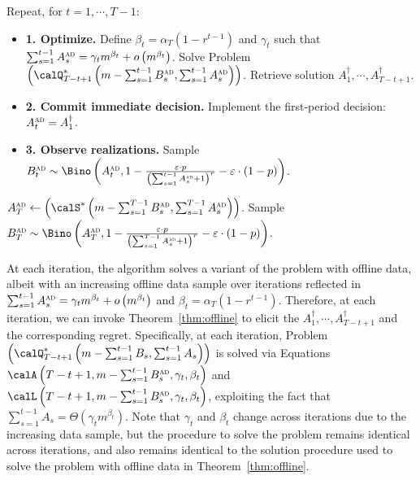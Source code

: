 \documentclass[blindrev]{informs3noheader}
\begin{document}
\begin{algorithm} [h!]
\caption{Adaptive algorithm to solve Problem $(\calP^*)$.}\small
\label{alg:adaptive}
\begin{algorithmic}
\item Repeat, for $t=1,\cdots,T-1$:
\begin{itemize}
\item[] \textbf{1. Optimize.} Define $\beta_t=\alpha_T\left(1-r^{t-1}\right)$ and $\gamma_t$ such that $\sum_{s=1}^{t-1} A^{\textsc{ad}}_s=\gamma_t m^{\beta_t}+o\left(m^{\beta_t}\right)$. Solve Problem $\left(\calQ^*_{T-t+1}\left(m-\sum_{s=1}^{t-1}B^{\textsc{ad}}_s,\sum_{s=1}^{t-1} A^{\textsc{ad}}_s\right)\right)$. Retrieve solution $A^\dagger_1,\cdots,A^\dagger_{T-t+1}$.
\item[] \textbf{2. Commit immediate decision.} Implement the first-period decision: $A^{\textsc{ad}}_t=A^\dagger_1$.
\item[] \textbf{3. Observe realizations.} Sample $B^{\textsc{ad}}_t\sim \Bino\left(A^{\textsc{ad}}_t, 1- \frac{\varepsilon\cdot p}{\left(\sum_{s=1}^{t-1} A^{\textsc{ad}}_s +1\right)^r}-\varepsilon\cdot(1-p)\right)$.
\end{itemize}
\item $A^{\textsc{ad}}_T\gets\left(\calS^*\left(m-\sum_{s=1}^{T-1}B^{\textsc{ad}}_s,\sum_{s=1}^{T-1} A^{\textsc{ad}}_s\right)\right)$. Sample $B^{\textsc{ad}}_T\sim \Bino\left(A^{\textsc{ad}}_T, 1- \frac{\varepsilon\cdot p}{\left(\sum_{s=1}^{T-1} A^{\textsc{ad}}_s +1\right)^r}-\varepsilon\cdot(1-p)\right)$.
\end{algorithmic}
\end{algorithm}

At each iteration, the algorithm solves a variant of the problem with offline data, albeit with an increasing offline data sample over iterations reflected in $\sum_{s=1}^{t-1} A^{\textsc{ad}}_s=\gamma_t m^{\beta_t}+o\left(m^{\beta_t}\right)$ and $\beta_t=\alpha_T\left(1-r^{t-1}\right)$. Therefore, at each iteration, we can invoke Theorem~\ref{thm:offline} to elicit the $A^\dagger_1,\cdots,A^\dagger_{T-t+1}$ and the corresponding regret. Specifically, at each iteration, Problem~$\left(\calQ^*_{T-t+1}\left(m-\sum_{s=1}^{t-1}B_s,\sum_{s=1}^{t-1} A_s\right)\right)$ is solved via Equations $\calA\left(T-t+1,m-\sum_{s=1}^{t-1}B^{\textsc{ad}}_s,\gamma_t,\beta_t\right)$ and $\calL\left(T-t+1,m-\sum_{s=1}^{t-1}B^{\textsc{ad}}_s,\gamma_t,\beta_t\right)$, exploiting the fact that $\sum_{s=1}^{t-1} A_s=\Theta(\gamma_t m^{\beta_t})$. Note that $\gamma_t$ and $\beta_t$ change across iterations due to the increasing data sample, but the procedure to solve the problem remains identical across iterations, and also remains identical to the solution procedure used to solve the problem with offline data in Theorem~\ref{thm:offline}.
\end{document}
